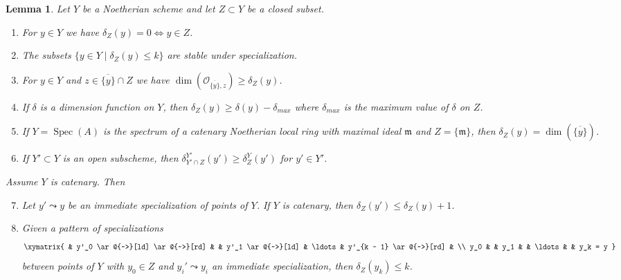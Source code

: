 \documentclass[10pt,a4paper]{amsart}
\theoremstyle{plain}
\newtheorem{lemma}[subsection]{Lemma}
\theoremstyle{definition}
\theoremstyle{remark}
\numberwithin{equation}{subsection}
\def\Spec{\mathop{\mathrm{Spec}}}
\begin{document}
\begin{lemma}
\label{lemma-discussion}
Let $Y$ be a Noetherian scheme and let $Z \subset Y$ be a closed subset.
\begin{enumerate}
\item For $y \in Y$ we have $\delta_Z(y) = 0 \Leftrightarrow y \in Z$.
\item The subsets $\{y \in Y \mid \delta_Z(y) \leq k\}$ are
stable under specialization.
\item For $y \in Y$ and $z \in \overline{\{y\}} \cap Z$ we have
$\dim(\mathcal{O}_{\overline{\{y\}}, z}) \geq \delta_Z(y)$.
\item If $\delta$ is a dimension function on $Y$, then
$\delta_Z(y) \geq \delta(y) - \delta_{max}$ where $\delta_{max}$
is the maximum value of $\delta$ on $Z$.
\item If $Y = \Spec(A)$ is the spectrum of a catenary Noetherian local ring
with maximal ideal $\mathfrak m$ and $Z = \{\mathfrak m\}$, then
$\delta_Z(y) = \dim(\overline{\{y\}})$.
\item If $Y' \subset Y$ is an open subscheme, then
$\delta^{Y'}_{Y' \cap Z}(y') \geq \delta^Y_Z(y')$ for $y' \in Y'$.
\end{enumerate}
Assume $Y$ is catenary. Then
\begin{enumerate}
\setcounter{enumi}{6}
\item Let $y' \leadsto y$ be an immediate specialization of points of $Y$.
If $Y$ is catenary, then $\delta_Z(y') \leq \delta_Z(y) + 1$.
\item Given a pattern of specializations
$$
\xymatrix{
& y'_0 \ar@{~>}[ld] \ar@{~>}[rd] &
& y'_1 \ar@{~>}[ld] & \ldots
& y'_{k - 1} \ar@{~>}[rd] &
\\
y_0 & &
y_1 & &
\ldots & &
y_k = y
}
$$
between points of $Y$ with $y_0 \in Z$ and $y_i' \leadsto y_i$
an immediate specialization, then $\delta_Z(y_k) \leq k$.
\end{enumerate}
\end{lemma}
\end{document}

